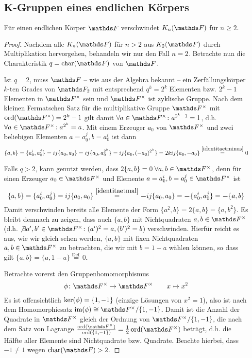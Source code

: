 \documentclass[ngerman,fontsize=11pt, paper=a4, parskip=half, titlepage=true, toc=bib]{scrartcl}
\begin{document}
\subsection{K-Gruppen eines endlichen Körpers}

\begin{Lem}
  Für einen endlichen Körper $\F$ verschwindet $\KnF$ für $n\geq 2$.
  \begin{proof}
    Nachdem alle $\KnF$ für $n>2$ aus $\K_2(\F)$ durch Multiplikation
    hervorgehen, behandeln wir nur den Fall $n=2$.
    Betrachte nun die Charakteristik $q=\Char(\F)$ von $\F$.

    Ist $q=2$, muss $\F$ – wie aus der Algebra bekannt – ein
    Zerfällungskörper $k$-ten Grades von $\F_2$ mit entsprechend
    $q^k=2^k$ Elementen bzw. $2^k-1$ Elementen in $\Fx$ sein und $\Fx$
    ist zyklische Gruppe.
    Nach dem kleinen Fermatschen Satz für die multiplikative Gruppe
    $\Fx$ mit $\Ord(\Fx)=2^k-1$ gilt damit $\forall a\in\Fx\colon a^{2^k-1}=1$, 
    d.h. $\forall a\in\Fx\colon a^{2^k} = a$.
    Mit einem Erzeuger $a_0$ von $\Fx$ und zwei beliebigen Elementen $a=a_0^j,
    b=a_0^i$ ist dann
    \begin{gather*}
      \{a,b\}=\{a_0^i, a_0^j\} = ij\{a_0,a_0\}
      = ij\{a_0,a_0^{2^k}\} = ij\{a_0, (-a_0)^{2^k}\} =
      2kij\{a_0,-a_0\} 
      \overset{\ref{identitaetminus}}{=} 0
    \end{gather*}

    Falls $q>2$, kann genutzt werden, dass $2\{a,b\}=0\;\forall a,b\in\Fx$,
    denn für einen Erzeuger $a_0\in\Fx$ und
    Elemente $a=a_0^i,b=a_0^j\in \Fx$ ist
    \begin{gather*}
      \{a,b\} = \{a_0^i,a_0^j\} = ij\{a_0,a_0\} 
      \overset{\ref{identitaetmal}}{=} \boldsymbol - ij\{a_0,a_0\}
      = \boldsymbol - \{a_0^i,a_0^j\} = \boldsymbol -\{a,b\} 
    \end{gather*}
    Damit verschwinden bereits alle Elemente der Form 
    $\{a^2,b\}=2\{a,b\}=\{a,b^2\}$. Es bleibt demnach zu zeigen, dass
    auch $\{a,b\}$ mit Nichtquadraten $a,b\in\Fx$
    (d.h. $\not\exists a',b'\in\Fx\colon (a')^2=a,(b')^2=b$)
    verschwinden.
    Hierfür reicht es aus, wie wir gleich sehen werden,
    $\{a,b\}$ mit fixen Nichtquadraten
    $a,b\in\Fx$ zu betrachten, die wir mit $b=1-a$ wählen können, 
    so dass gilt $\{a,b\}=\{a,1-a\}\overset{\text{Def.}}{=}0$.
    
    Betrachte vorerst den Gruppenhomomorphismus
    \begin{gather*}
      \phi\colon\Fx \to \Fx
      \qquad x\mapsto x^2
    \end{gather*}
    Es ist offensichtlich $\operatorname{ker}(\phi)=\{1,-1\}$ (einzige Lösungen von
    $x^2=1$), also ist nach dem Homomorphiesatz
    $\im(\phi)\cong \Fx/\{1,-1\}$. Damit ist die Anzahl der Quadrate
    in $\Fx$ gleich der Ordnung von $\Fx/\{1,-1\}$, die nach dem Satz
    von Lagrange
    $\frac{\Ord(\Fx)}{\Ord(\{1,-1\})}=\frac{1}{2}\Ord(\Fx)$
    beträgt, d.h. die Hälfte aller Elemente sind Nichtquadrate
    bzw. Quadrate. Beachte hierbei, dass $-1\neq 1$ wegen $\Char(\F)>2$.


\end{proof}
\end{Lem}
\end{document}
